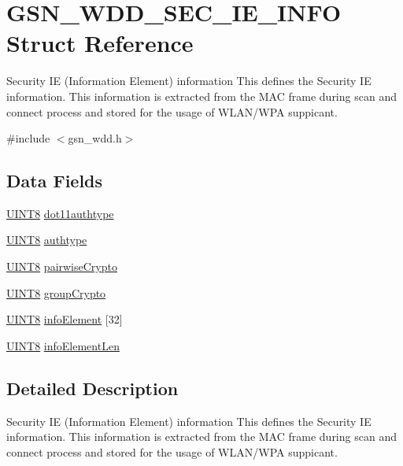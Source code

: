\hypertarget{a00292}{
\section{GSN\_\-WDD\_\-SEC\_\-IE\_\-INFO Struct Reference}
\label{a00292}
}


Security IE (Information Element) information This defines the Security IE information. This information is extracted from the MAC frame during scan and connect process and stored for the usage of WLAN/WPA suppicant.  




{\ttfamily \#include $<$gsn\_\-wdd.h$>$}

\subsection*{Data Fields}
\begin{DoxyCompactItemize}
\item 
\hyperlink{a00660_gab27e9918b538ce9d8ca692479b375b6a}{UINT8} \hyperlink{a00292_aae6f1d203042b11df814ffc52e3bb9df}{dot11authtype}
\item 
\hyperlink{a00660_gab27e9918b538ce9d8ca692479b375b6a}{UINT8} \hyperlink{a00292_a9e91fd4de1668c3ea9ad4281963d2e7b}{authtype}
\item 
\hyperlink{a00660_gab27e9918b538ce9d8ca692479b375b6a}{UINT8} \hyperlink{a00292_aea9ac9a7170aa6715444395f9b97f1ca}{pairwiseCrypto}
\item 
\hyperlink{a00660_gab27e9918b538ce9d8ca692479b375b6a}{UINT8} \hyperlink{a00292_ada57203c7d5f11c7d66faf0a7d619b99}{groupCrypto}
\item 
\hyperlink{a00660_gab27e9918b538ce9d8ca692479b375b6a}{UINT8} \hyperlink{a00292_ac51b90843d296d1e4c5f5145473b6be2}{infoElement} \mbox{[}32\mbox{]}
\item 
\hyperlink{a00660_gab27e9918b538ce9d8ca692479b375b6a}{UINT8} \hyperlink{a00292_a46d032f9b1c2c11576045847162b9522}{infoElementLen}
\end{DoxyCompactItemize}


\subsection{Detailed Description}
Security IE (Information Element) information This defines the Security IE information. This information is extracted from the MAC frame during scan and connect process and stored for the usage of WLAN/WPA suppicant. 

